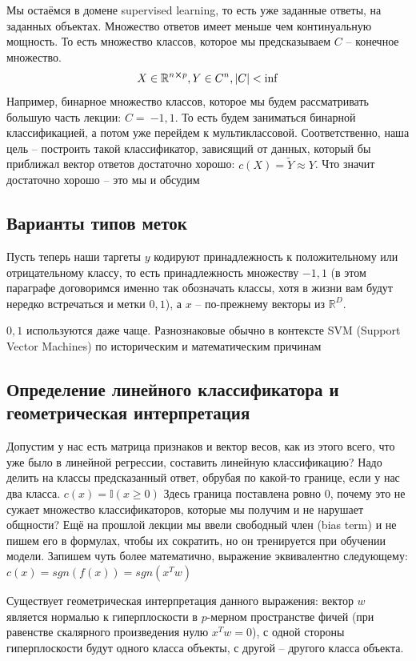 Мы остаёмся в домене supervised learning, то есть уже заданные ответы, на заданных объектах.
Множество ответов имеет меньше чем континуальную мощность.
То есть множество классов, которое мы предсказываем $C$ -- конечное множество.
\[ X \in \mathbb{R}^{n \cross p} , Y \in C^n, \abs{C} < \inf \]
Например, бинарное множество классов, которое мы будем рассматривать большую часть лекции: $C =~{-1, 1}$.
То есть будем заниматься бинарной классификацией, а потом уже перейдем к мультиклассовой.
Соответственно, наша цель -- построить такой классификатор, зависящий от данных, который бы приближал вектор ответов
достаточно хорошо: $c(X) = \tilde{Y} \approx Y $.
Что значит достаточно хорошо -- это мы и обсудим

\subsection{Варианты типов меток}

Пусть теперь наши таргеты $y$ кодируют принадлежность к положительному или отрицательному классу, то есть
принадлежность множеству ${-1,1}$ (в этом параграфе договоримся именно так обозначать классы, хотя в жизни вам будут
нередко встречаться и метки ${0,1}$), а $x$ -- по-прежнему векторы из $\mathbb{R}^D$.

${0,1}$ используются даже чаще.
Разнознаковые обычно в контексте SVM (Support Vector Machines) по историческим и математическим причинам

\subsection{Определение линейного классификатора и геометрическая интерпретация}

Допустим у нас есть матрица признаков и вектор весов, как из этого всего, что уже было в линейной регрессии,
составить линейную классификацию?
Надо делить на классы предсказанный ответ, обрубая по какой-то границе, если у нас два класса.
$c(x) = \mathbb{I} (x \geq 0)$
Здесь граница поставлена ровно 0, почему это не сужает множество классификаторов, которые мы получим и
не нарушает общности?
Ещё на прошлой лекции мы ввели свободный член (bias term) и не пишем его в формулах, чтобы их сократить,
но он тренируется при обучении модели.
Запишем чуть более математично, выражение эквивалентно следующему: $c(x) = sgn (f(x)) = sgn(x^T w)$

Существует геометрическая интерпретация данного выражения: вектор $w$ является нормалью к гиперплоскости в $p$-мерном
пространстве фичей (при равенстве скалярного произведения нулю $x^T w = 0$), с одной стороны гиперплоскости будут одного
класса объекты, с другой -- другого класса объекта.

